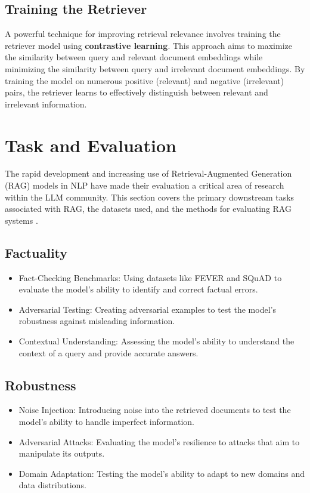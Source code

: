 \subsection{Training the Retriever}
A powerful technique for improving retrieval relevance involves training the retriever model using \textbf{contrastive learning}. This approach aims to maximize the similarity between query and relevant document embeddings while minimizing the similarity between query and irrelevant document embeddings. By training the model on numerous positive (relevant) and negative (irrelevant) pairs, the retriever learns to effectively distinguish between relevant and irrelevant information\cite{sbert2024}.
\section{Task and Evaluation}
The rapid development and increasing use of Retrieval-Augmented Generation (RAG) models in NLP have made their evaluation a critical area of research within the LLM community. This section covers the primary downstream tasks associated with RAG, the datasets used, and the methods for evaluating RAG systems \cite{zhou2020trustworthiness}.
\subsection{Factuality}
\begin{itemize}
	\item Fact-Checking Benchmarks: Using datasets like FEVER and SQuAD to evaluate the model's ability to identify and correct factual errors.
	\item Adversarial Testing: Creating adversarial examples to test the model's robustness against misleading information.
	\item Contextual Understanding: Assessing the model's ability to understand the context of a query and provide accurate answers.
\end{itemize}
\subsection{ Robustness}
\begin{itemize}
	\item Noise Injection: Introducing noise into the retrieved documents to test the model's ability to handle imperfect information.
	\item Adversarial Attacks: Evaluating the model's resilience to attacks that aim to manipulate its outputs.
	\item Domain Adaptation: Testing the model's ability to adapt to new domains and data distributions.
\end{itemize}
